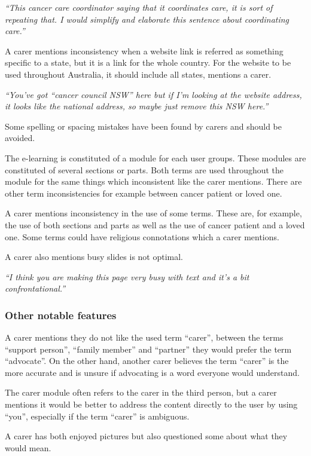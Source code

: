 \documentclass{sigchi}
\begin{document}
\textit{“This cancer care coordinator saying that it coordinates care, it is sort of repeating that. I would simplify and elaborate this sentence about coordinating care.”}

A carer mentions inconsistency when a website link is referred as something specific to a state, but it is a link for the whole country. For the website to be used throughout Australia, it should include all states, mentions a carer. 

\textit{“You’ve got “cancer council NSW” here but if I’m looking at the website address, it looks like the national address, so maybe just remove this NSW here.”}

Some spelling or spacing mistakes have been found by carers and should be avoided.

The e-learning is constituted of a module for each user groups. These modules are constituted of several sections or parts. Both terms are used throughout the module for the same things which inconsistent like the carer mentions. There are other term inconsistencies for example between cancer patient or loved one.

A carer mentions inconsistency in the use of some terms. These are, for example, the use of both sections and parts as well as the use of cancer patient and a loved one. Some terms could have religious connotations which a carer mentions.

A carer also mentions busy slides is not optimal.

\textit{“I think you are making this page very busy with text and it’s a bit confrontational.”}

\subsubsection{Other notable features}
A carer mentions they do not like the used term “carer”, between the terms “support person”, “family member” and “partner” they would prefer the term “advocate”. On the other hand, another carer believes the term “carer” is the more accurate and is unsure if advocating is a word everyone would understand.

The carer module often refers to the carer in the third person, but a carer mentions it would be better to address the content directly to the user by using “you”, especially if the term “carer” is ambiguous. 

A carer has both enjoyed pictures but also questioned some about what they would mean.
\end{document}
